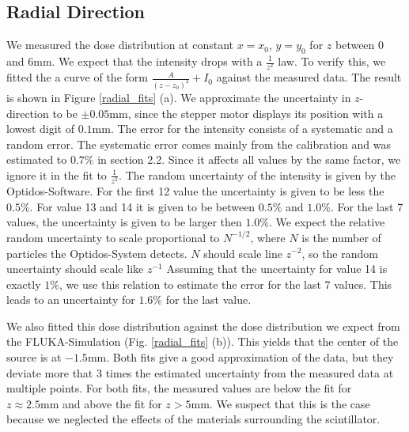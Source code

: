 \documentclass[a4paper,parskip]{scrartcl}
\begin{document}
\subsection{Radial Direction}


We measured the dose distribution at constant $x=x_0$, $y=y_0$ for $z$ between 0 and 6mm. We expect that the intensity drops with a $\frac{1}{z^ 2}$ law. To verify this, we fitted the a curve of the form $\frac{A}{(z-z_0)^ 2}+I_0$ against the measured data. The result is shown in Figure \ref{radial_fits} (a). We approximate the uncertainty in $z$-direction to be $\pm 0.05 \mathrm{mm}$, since the stepper motor displays its position with a lowest digit of $0.1\mathrm{mm}$. The error for the intensity consists of a systematic and a random error. The systematic error comes mainly from the calibration and was estimated to $0.7\%$ in section 2.2. Since it affects all values by the same factor, we ignore it in the fit to $\frac{1}{z^2}$. The random uncertainty of the intensity is given by the Optidos-Software. For the first 12 value the uncertainty is given to be less the $0.5\%$. For value 13 and 14 it is given to be between $0.5\%$ and $1.0\%$. For the last 7 values, the uncertainty is given to be larger then $1.0\%$. We expect the relative random uncertainty to scale proportional to $N^ {-1/2}$, where $N$ is the number of particles the Optidos-System detects. $N$ should scale line $z^ {-2}$, so the random uncertainty should scale like $z^ {-1}$ Assuming that the uncertainty for value 14 is exactly $1\%$, we use this relation to estimate the error for the last 7 values. This leads to an uncertainty for $1.6\%$ for the last value.

We also fitted this dose distribution against the dose distribution we expect from the FLUKA-Simulation (Fig. \ref{radial_fits} (b)). This yields that the center of the source is at $-1.5 \mathrm{mm}$. Both fits give a good approximation of the data, but they deviate more that 3 times the estimated uncertainty from the measured data at multiple points. For both fits, the measured values are below the fit for $z \approx 2.5 \mathrm{mm}$ and above the fit for $z > 5 \mathrm{mm}$. We suspect that this is the case because we neglected the effects of the materials surrounding the scintillator. 
\end{document}
